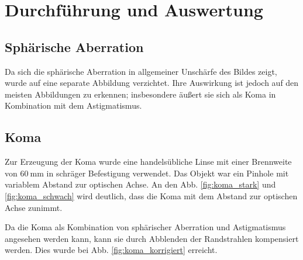 \section{Durchführung und Auswertung}

\subsection{Sphärische Aberration}

Da sich die sphärische Aberration in allgemeiner Unschärfe des Bildes zeigt, wurde auf eine separate Abbildung verzichtet. Ihre Auswirkung ist jedoch auf den meisten Abbildungen zu erkennen; insbesondere äußert sie sich als Koma in Kombination mit dem Astigmatismus.

\subsection{Koma}

Zur Erzeugung der Koma wurde eine handelsübliche Linse mit einer Brennweite von $\SI{60}{\milli\meter}$ in schräger Befestigung verwendet. Das Objekt war ein Pinhole mit variablem Abstand zur optischen Achse. An den Abb. \ref{fig:koma_stark} und \ref{fig:koma_schwach} wird deutlich, dass die Koma mit dem Abstand zur optischen Achse zunimmt. 

Da die Koma als Kombination von sphärischer Aberration und Astigmatismus angesehen werden kann, kann sie durch Abblenden der Randstrahlen kompensiert werden. Dies wurde bei Abb. \ref{fig:koma_korrigiert} erreicht.

